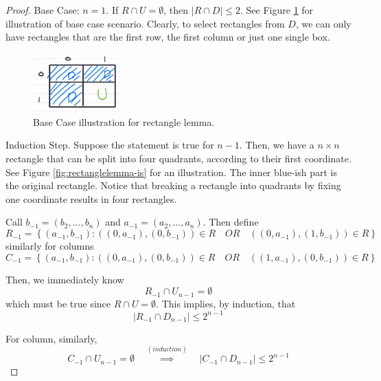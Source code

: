 \begin{proof}
	Base Case: $n = 1$. If $R \cap U = \emptyset$, then $|R \cap D | \leq 2$. See Figure \ref{fig:rectanglelemma-basecase} for illustration of base case scenario. Clearly, to select rectangles from $D$, we can only have rectangles that are the first row, the first column or just one single box. 
	
	\begin{figure}
		\center 
		\includegraphics[width=0.3\textwidth]{figs/rectanglelemma-basecase.png}
		\caption{Base Case illustration for rectangle lemma.}
		\label{fig:rectanglelemma-basecase}
	\end{figure}
	
	Induction Step. Suppose the statement is true for $n - 1$. Then, we have a $n \times n$ rectangle that can be split into four quadrants, according to their first coordinate. See Figure \ref{fig:rectanglelemma-is} for an illustration. The inner blue-ish part is the original rectangle. Notice that breaking a rectangle into quadrants by fixing one coordinate results in four rectangles.
	
	Call $b_{-1} = (b_2, \dots, b_n)$ and $a_{-1} = (a_2, \dots, a_n)$. Then define
	\begin{equation}
		R_{-1} = \left\{ 
			(a_{-1}, b_{-1}) : ((0, a_{-1}), (0, b_{-1})) \in R \quad OR \quad ((0, a_{-1}), (1, b_{-1})) \in R
		\right\}
	\end{equation}
	similarly for columns 
	\begin{equation}
		C_{-1} = \left\{ 
			(a_{-1}, b_{-1}) : ((0, a_{-1}), (0, b_{-1})) \in R \quad OR \quad ((1, a_{-1}), (0 , b_{-1})) \in R
		\right\}
	\end{equation}
	
	Then, we immediately know 
	\begin{equation}
		R_{-1} \cap U_{n-1} = \emptyset
	\end{equation}
	which must be true since $R \cap U = \emptyset$. This implies, by induction, that
	\begin{equation}
		|R_{-1} \cap D_{n - 1}| \leq 2^{n - 1}
	\end{equation}
	
	For column, similarly, 
	\begin{equation}
		C_{-1} \cap U_{n - 1} = \emptyset \quad \overset{(induction)}{\implies} \quad |C_{-1} \cap D_{n-1} | \leq 2^{n-1}
	\end{equation}
	

\end{proof}
